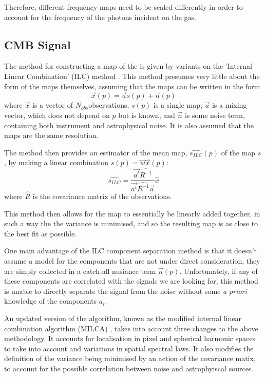 Therefore, different frequency maps need to be scaled differently in order to account for the frequency of the photons incident on the gas. 


\subsection{CMB Signal}

The method for constructing a map of the \sze is given by variants on the 'Internal Linear Combination' (ILC) method \citep{2011MNRAS.410.2481R}. This method presumes very little about the form of the maps themselves, assuming that the maps can be written in the form 
\begin{equation}
\vec{x}(p) = \vec{a} s(p) + \vec{n}(p) 
\label{eq:ilc_1}
\end{equation}
where $\vec{x}$ is a vector of $N_{obs} $observations, $s(p)$ is a single map, $\vec{a}$ is a mixing vector, which does not depend on $p$ but is known, and $\vec{n}$ is some noise term, containing both instrument and astrophysical noise. It is also assumed that the maps are the same resolution.

The method then provides an estimator of the mean map, $\hat{s_{ILC}}(p)$ of the map $s$, by making a linear combination $\hat{s}(p) = \vec{w} \vec{x}(p)$:
\begin{equation}
\hat{s_{ILC}} = \frac{\vec{a^t} \hat{R^{-1}}}{\vec{a^t} \hat{R^{-1}} \vec{a}} \hat{x}
\end{equation}
where $\hat{R}$ is the covariance matrix of the observations. 

This method then allows for the map to essentially be linearly added together, in such a way the the variance is minimised, and so the resulting map is as close to the best fit as possible. 
\par One main advantage of the ILC component separation method is that it doesn't assume a model for the components that are not under direct consideration, they are simply collected in a catch-all nusiance term $\vec{n}(p)$. Unfortunately, if any of these components are correlated with the signals we are looking for, this method is unable to directly separate the signal from the noise without some \textit{a priori} knowledge of the components $a_i$.

An updated version of the algorithm, known as the modified internal linear combination algorithm (MILCA) \citep{2013A&A...558A.118H}, takes into account three changes to the above methodology. It accounts for localisation in pixel and spherical harmonic spaces to take into account and variations in spatial spectral laws. It also modifies the definition of the variance being minimised by an action of the covariance matix, to account for the possible correlation between noise and astrophyiscal sources.

